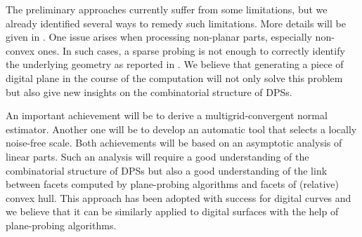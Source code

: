 The preliminary approaches \cite{LPRTCS2016, LPRDGCI2016, LPRJMIV2017}
currently suffer from some limitations, but we already identified several ways
to remedy such limitations. More details will be given in . 
One issue arises when processing non-planar parts, especially non-convex ones.
In such cases, a sparse probing is not enough to correctly identify the underlying geometry
as reported in \cite{LPRJMIV2017}.
We believe that generating a piece of digital plane in the course of the computation will
not only solve this problem but also give new insights on the combinatorial structure
of DPSs. 

An important achievement will be to derive a multigrid-convergent normal estimator.
Another one will be to develop an automatic tool that selects a locally noise-free scale.
Both achievements will be based on an asymptotic analysis of linear parts. Such an analysis
will require a good understanding of the combinatorial structure of DPSs
but also a good understanding of the link between facets computed by plane-probing algorithms and
facets of (relative) convex hull. This approach has been adopted with success for digital
curves \cite{Lachaud2012} and we believe that it can be similarly applied to digital
surfaces with the help of plane-probing algorithms.
 
